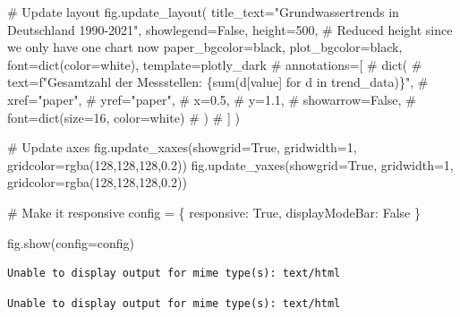 \documentclass[
  letterpaper,
  DIV=11]{scrartcl}
\newenvironment{Shaded}{\begin{snugshade}}{\end{snugshade}}
\newcommand{\BuiltInTok}[1]{\textcolor[rgb]{0.00,0.23,0.31}{#1}}
\newcommand{\CommentTok}[1]{\textcolor[rgb]{0.37,0.37,0.37}{#1}}
\newcommand{\DecValTok}[1]{\textcolor[rgb]{0.68,0.00,0.00}{#1}}
\newcommand{\NormalTok}[1]{\textcolor[rgb]{0.00,0.23,0.31}{#1}}
\newcommand{\OperatorTok}[1]{\textcolor[rgb]{0.37,0.37,0.37}{#1}}
\newcommand{\StringTok}[1]{\textcolor[rgb]{0.13,0.47,0.30}{#1}}
\newcommand{\VariableTok}[1]{\textcolor[rgb]{0.07,0.07,0.07}{#1}}
\begin{document}
\begin{Shaded}
\begin{Highlighting}[]
\CommentTok{\# Update layout}
\NormalTok{fig.update\_layout(}
\NormalTok{    title\_text}\OperatorTok{=}\StringTok{"Grundwassertrends in Deutschland 1990{-}2021"}\NormalTok{,}
\NormalTok{    showlegend}\OperatorTok{=}\VariableTok{False}\NormalTok{,}
\NormalTok{    height}\OperatorTok{=}\DecValTok{500}\NormalTok{,  }\CommentTok{\# Reduced height since we only have one chart now}
\NormalTok{    paper\_bgcolor}\OperatorTok{=}\StringTok{\textquotesingle{}black\textquotesingle{}}\NormalTok{,}
\NormalTok{    plot\_bgcolor}\OperatorTok{=}\StringTok{\textquotesingle{}black\textquotesingle{}}\NormalTok{,}
\NormalTok{    font}\OperatorTok{=}\BuiltInTok{dict}\NormalTok{(color}\OperatorTok{=}\StringTok{\textquotesingle{}white\textquotesingle{}}\NormalTok{),}
\NormalTok{    template}\OperatorTok{=}\StringTok{\textquotesingle{}plotly\_dark\textquotesingle{}}
    \CommentTok{\# annotations=[}
    \CommentTok{\#     dict(}
    \CommentTok{\#         text=f"Gesamtzahl der Messstellen: \{sum(d[\textquotesingle{}value\textquotesingle{}] for d in trend\_data)\}",}
    \CommentTok{\#         xref="paper",}
    \CommentTok{\#         yref="paper",}
    \CommentTok{\#         x=0.5,}
    \CommentTok{\#         y=1.1,}
    \CommentTok{\#         showarrow=False,}
    \CommentTok{\#         font=dict(size=16, color=\textquotesingle{}white\textquotesingle{})}
    \CommentTok{\#     )}
    \CommentTok{\# ]}
\NormalTok{)}

\CommentTok{\# Update axes}
\NormalTok{fig.update\_xaxes(showgrid}\OperatorTok{=}\VariableTok{True}\NormalTok{, gridwidth}\OperatorTok{=}\DecValTok{1}\NormalTok{, gridcolor}\OperatorTok{=}\StringTok{\textquotesingle{}rgba(128,128,128,0.2)\textquotesingle{}}\NormalTok{)}
\NormalTok{fig.update\_yaxes(showgrid}\OperatorTok{=}\VariableTok{True}\NormalTok{, gridwidth}\OperatorTok{=}\DecValTok{1}\NormalTok{, gridcolor}\OperatorTok{=}\StringTok{\textquotesingle{}rgba(128,128,128,0.2)\textquotesingle{}}\NormalTok{)}

\CommentTok{\# Make it responsive}
\NormalTok{config }\OperatorTok{=}\NormalTok{ \{}
    \StringTok{\textquotesingle{}responsive\textquotesingle{}}\NormalTok{: }\VariableTok{True}\NormalTok{,}
    \StringTok{\textquotesingle{}displayModeBar\textquotesingle{}}\NormalTok{: }\VariableTok{False}
\NormalTok{\}}

\NormalTok{fig.show(config}\OperatorTok{=}\NormalTok{config)}
\end{Highlighting}
\end{Shaded}

\begin{verbatim}
Unable to display output for mime type(s): text/html
\end{verbatim}

\begin{verbatim}
Unable to display output for mime type(s): text/html
\end{verbatim}
\end{document}
